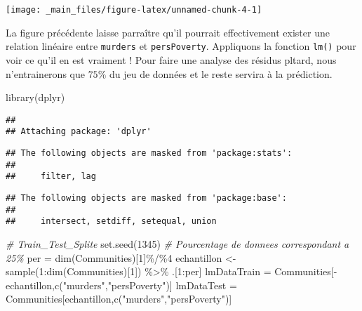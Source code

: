 \documentclass[
]{book}
\newenvironment{Shaded}{\begin{snugshade}}{\end{snugshade}}
\newcommand{\CommentTok}[1]{\textcolor[rgb]{0.56,0.35,0.01}{\textit{#1}}}
\newcommand{\DecValTok}[1]{\textcolor[rgb]{0.00,0.00,0.81}{#1}}
\newcommand{\FunctionTok}[1]{\textcolor[rgb]{0.00,0.00,0.00}{#1}}
\newcommand{\NormalTok}[1]{#1}
\newcommand{\OtherTok}[1]{\textcolor[rgb]{0.56,0.35,0.01}{#1}}
\newcommand{\SpecialCharTok}[1]{\textcolor[rgb]{0.00,0.00,0.00}{#1}}
\newcommand{\StringTok}[1]{\textcolor[rgb]{0.31,0.60,0.02}{#1}}
\begin{document}
\begin{center}\texttt{[image: \_main\_files/figure-latex/unnamed-chunk-4-1]} \end{center}

La figure précédente laisse parraître qu'il pourrait effectivement exister une relation linéaire entre \texttt{murders} et \texttt{persPoverty}. Appliquons la fonction \texttt{lm()} pour voir ce qu'il en est vraiment ! Pour faire une analyse des résidus pltard, nous n'entrainerons que \(75\%\) du jeu de données et le reste servira à la prédiction.\\

\begin{Shaded}
\begin{Highlighting}[]
\FunctionTok{library}\NormalTok{(dplyr)}
\end{Highlighting}
\end{Shaded}

\begin{verbatim}
## 
## Attaching package: 'dplyr'
\end{verbatim}

\begin{verbatim}
## The following objects are masked from 'package:stats':
## 
##     filter, lag
\end{verbatim}

\begin{verbatim}
## The following objects are masked from 'package:base':
## 
##     intersect, setdiff, setequal, union
\end{verbatim}

\begin{Shaded}
\begin{Highlighting}[]
\CommentTok{\# Train\_Test\_Splite}
\FunctionTok{set.seed}\NormalTok{(}\DecValTok{1345}\NormalTok{)}
\CommentTok{\# Pourcentage de donnees correspondant a 25\%}
\NormalTok{per }\OtherTok{=} \FunctionTok{dim}\NormalTok{(Communities)[}\DecValTok{1}\NormalTok{]}\SpecialCharTok{\%/\%}\DecValTok{4}
\NormalTok{echantillon }\OtherTok{\textless{}{-}} \FunctionTok{sample}\NormalTok{(}\DecValTok{1}\SpecialCharTok{:}\FunctionTok{dim}\NormalTok{(Communities)[}\DecValTok{1}\NormalTok{]) }\SpecialCharTok{\%\textgreater{}\%}\NormalTok{ .[}\DecValTok{1}\SpecialCharTok{:}\NormalTok{per]}
\NormalTok{lmDataTrain }\OtherTok{=}\NormalTok{ Communities[}\SpecialCharTok{{-}}\NormalTok{echantillon,}\FunctionTok{c}\NormalTok{(}\StringTok{"murders"}\NormalTok{,}\StringTok{"persPoverty"}\NormalTok{)]}
\NormalTok{lmDataTest }\OtherTok{=}\NormalTok{ Communities[echantillon,}\FunctionTok{c}\NormalTok{(}\StringTok{"murders"}\NormalTok{,}\StringTok{"persPoverty"}\NormalTok{)]}
\end{Highlighting}
\end{Shaded}
\end{document}
